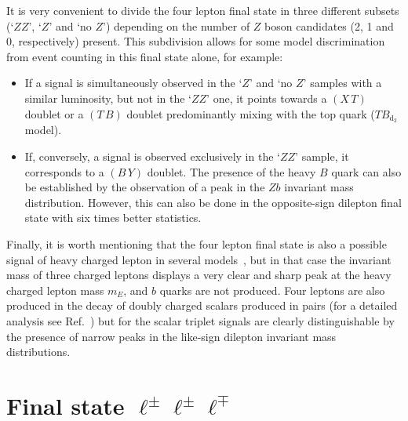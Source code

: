 \documentclass[12pt,a4paper]{article}
\newcommand{\TBD}{TB_{\text{d}_2}}
\newcommand{\TB}{(T \, B)}
\newcommand{\XT}{(X \, T)}
\newcommand{\BY}{(B \, Y)}
\begin{document}
It is very convenient to divide the four lepton final state in three different subsets (`$ZZ$', `$Z$' and `no $Z$') depending on the number of $Z$ boson candidates (2, 1 and 0, respectively) present. This subdivision allows for some model discrimination from event counting in this final state alone, for example:
\begin{itemize}
\item If a signal is simultaneously observed in the `$Z$' and `no $Z$' samples with a similar luminosity, but not in the `$ZZ$' one, it points towards a $\XT$ doublet or a $\TB$ doublet predominantly mixing  with the top quark ($\TBD$ model).
\item If, conversely, a signal is observed exclusively in the `$ZZ$' sample, it corresponds to a $\BY$ doublet. The presence of the heavy $B$ quark can also be established by the observation of a peak in the $Zb$ invariant mass distribution. However, this can also be done in the opposite-sign dilepton final state with six times better statistics.
\end{itemize}
Finally, it is worth mentioning that
the four lepton final state is also a possible signal of heavy charged lepton in several models~\cite{AguilarSaavedra:2009ik}, but in that case the invariant mass of three charged leptons displays a very clear and sharp peak at the heavy charged lepton mass $m_E$, and $b$ quarks are not produced. Four leptons are also produced in the decay of doubly charged scalars produced in pairs (for a detailed analysis see Ref.~\cite{delAguila:2008cj}) but for the scalar triplet signals are clearly distinguishable by the presence of narrow peaks in the like-sign dilepton invariant mass distributions.

\section{Final state $\ell^\pm \ell^\pm \ell^\mp$}
\label{sec:3l}
\end{document}
